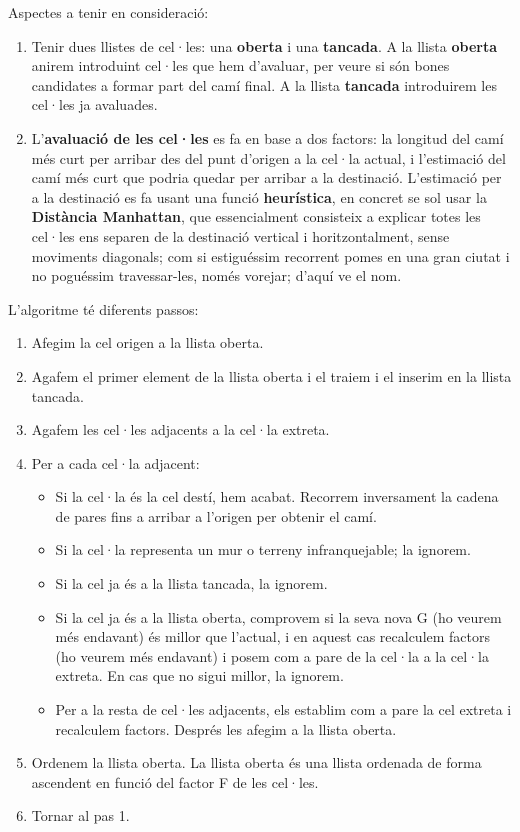 \documentclass[12pt]{article}
\begin{document}
Aspectes a tenir en consideració:

\begin{enumerate}
	\item Tenir dues llistes de cel·les: una \textbf{oberta} i una \textbf{tancada}. A la llista \textbf{oberta} anirem introduint cel·les que hem d'avaluar, per veure si són bones candidates a formar part del camí final. A la llista \textbf{tancada} introduirem les cel·les ja avaluades.

	\item L'\textbf{avaluació de les cel·les} es fa en base a dos factors: la longitud del camí més curt per arribar des del punt d'origen a la cel·la actual, i l'estimació del camí més curt que podria quedar per arribar a la destinació. L'estimació per a la destinació es fa usant una funció \textbf{heurística}, en concret se sol usar la \textbf{Distància Manhattan}, que essencialment consisteix a explicar totes les cel·les ens separen de la destinació vertical i horitzontalment, sense moviments diagonals; com si estiguéssim recorrent pomes en una gran ciutat i no poguéssim travessar-les, només vorejar; d'aquí ve el nom.
\end{enumerate}

L'algoritme té diferents passos:

\begin{enumerate}
	\item Afegim la cel origen a la llista oberta.
	\item Agafem el primer element de la llista oberta i el traiem i el inserim en la llista tancada.
	\item Agafem les cel·les adjacents a la cel·la extreta.
	\item Per a cada cel·la adjacent:
	\begin{itemize}
		\item Si la cel·la és la cel destí, hem acabat. Recorrem inversament la cadena de pares fins a arribar a l'origen per obtenir el camí.
		\item Si la cel·la representa un mur o terreny infranquejable; la ignorem.
		\item Si la cel ja és a la llista tancada, la ignorem.
		\item Si la cel ja és a la llista oberta, comprovem si la seva nova G (ho veurem més endavant) és millor que l'actual, i en aquest cas recalculem factors (ho veurem més endavant) i posem com a pare de la cel·la a la cel·la extreta. En cas que no sigui millor, la ignorem.
		\item Per a la resta de cel·les adjacents, els establim com a pare la cel extreta i recalculem factors. Després les afegim a la llista oberta.
	\end{itemize}
	\item Ordenem la llista oberta. La llista oberta és una llista ordenada de forma ascendent en funció del factor F de les cel·les.
	\item Tornar al pas 1.
\end{enumerate}
\end{document}
